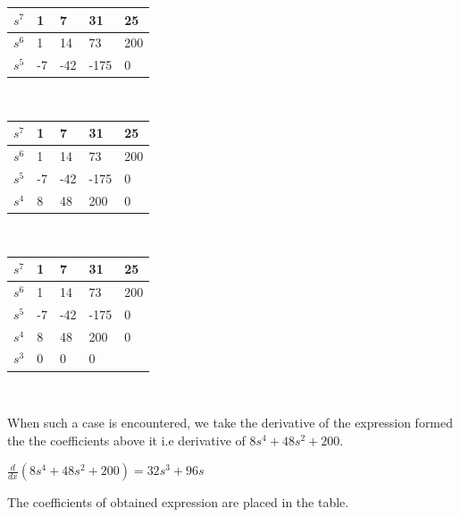 \begin{center}

\begin{tabular}{ |p{1.25cm}|p{1.25cm}|p{1.25cm}|p{1.25cm}|p{1.25cm}|  }
\hline
$s^7$ & 1 & 7 & 31 & 25\\
\hline
$s^6$ & 1 & 14 & 73 & 200\\
\hline
$s^5$ & -7 & -42 & -175 & 0\\
\hline
\end{tabular}\\

\begin{tabular}{ |p{1.25cm}|p{1.25cm}|p{1.25cm}|p{1.25cm}|p{1.25cm}|  }
\hline
$s^7$ & 1 & 7 & 31 & 25\\
\hline
$s^6$ & 1 & 14 & 73 & 200\\
\hline
$s^5$ & -7 & -42 & -175 & 0\\
\hline
$s^4$ & 8 & 48 & 200 & 0\\
\hline
\end{tabular}\\

\begin{tabular}{ |p{1.25cm}|p{1.25cm}|p{1.25cm}|p{1.25cm}|p{1.25cm}|  }
\hline
$s^7$ & 1 & 7 & 31 & 25\\
\hline
$s^6$ & 1 & 14 & 73 & 200\\
\hline
$s^5$ & -7 & -42 & -175 & 0\\
\hline
$s^4$ & 8 & 48 & 200 & 0\\
\hline
$s^3$ & 0 & 0 & 0 &  \\
\hline
\end{tabular}\\
\end{center}

When such a case is encountered, we take the derivative of the expression formed the the coefficients above it i.e derivative of $8s^4 + 48s^2 +200$.
\begin{center}
    $\frac{d}{dx}(8s^4 + 48s^2 +200) = 32s^3 + 96s$
\end{center}

The coefficients of obtained expression are placed in the table.

